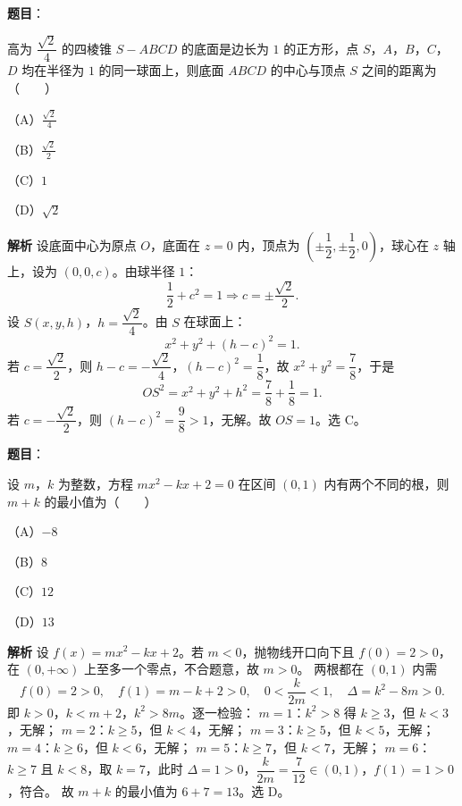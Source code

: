 \begin{answer}

\textbf{题目}：

高为 $\dfrac{\sqrt2}4$ 的四棱锥 $S-ABCD$ 的底面是边长为 $1$ 的正方形，点 $S$，$A$，$B$，$C$，$D$ 均在半径为 $1$ 的同一球面上，则底面 $ABCD$ 的中心与顶点 $S$ 之间的距离为\mbox{（　　）}

（A）$\frac{\sqrt2}4$

（B）$\frac{\sqrt2}2$

（C）$1$

（D）$\sqrt2$

\textbf{解析}
设底面中心为原点 $O$，底面在 $z=0$ 内，顶点为 $\left(\pm\dfrac12,\pm\dfrac12,0\right)$，球心在 $z$ 轴上，设为 $(0,0,c)$。由球半径 $1$：
\nopagebreak[4]
\[\frac12+c^2=1\Longrightarrow c=\pm\frac{\sqrt2}2.\]
设 $S(x,y,h)$，$h=\dfrac{\sqrt2}4$。由 $S$ 在球面上：
\nopagebreak[4]
\[x^2+y^2+(h-c)^2=1.\]
若 $c=\dfrac{\sqrt2}2$，则 $h-c=-\dfrac{\sqrt2}4$，$(h-c)^2=\dfrac18$，故 $x^2+y^2=\dfrac78$，于是
\nopagebreak[4]
\[OS^2=x^2+y^2+h^2=\frac78+\frac18=1.\]
若 $c=-\dfrac{\sqrt2}2$，则 $(h-c)^2=\dfrac98>1$，无解。故 $OS=1$。选 C。


\end{answer}
\begin{answer}

\textbf{题目}：

设 $m$，$k$ 为整数，方程 $mx^2-kx+2=0$ 在区间 $(0,1)$ 内有两个不同的根，则 $m+k$ 的最小值为\mbox{（　　）}

（A）$-8$

（B）$8$

（C）$12$

（D）$13$

\textbf{解析}
设 $f(x)=mx^2-kx+2$。若 $m<0$，抛物线开口向下且 $f(0)=2>0$，在 $(0,+\infty)$ 上至多一个零点，不合题意，故 $m>0$。
两根都在 $(0,1)$ 内需
\nopagebreak[4]
\[f(0)=2>0,\quad f(1)=m-k+2>0,\quad 0<\frac k{2m}<1,\quad \Delta=k^2-8m>0.\]
即 $k>0$，$k<m+2$，$k^2>8m$。逐一检验：
$m=1$：$k^2>8$ 得 $k\geqslant3$，但 $k<3$，无解；
$m=2$：$k\geqslant5$，但 $k<4$，无解；
$m=3$：$k\geqslant5$，但 $k<5$，无解；
$m=4$：$k\geqslant6$，但 $k<6$，无解；
$m=5$：$k\geqslant7$，但 $k<7$，无解；
$m=6$：$k\geqslant7$ 且 $k<8$，取 $k=7$，此时 $\Delta=1>0$，$\dfrac k{2m}=\dfrac7{12}\in(0,1)$，$f(1)=1>0$，符合。
故 $m+k$ 的最小值为 $6+7=13$。选 D。


\end{answer}
